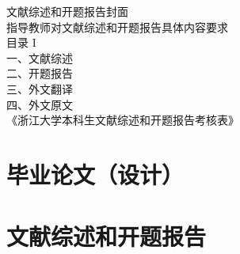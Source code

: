\documentclass[a4paper, 12pt,twoside]{ctexart}
\begin{document}
   
       
    
    \resetoddpageheadings  %
    
    \resetoddpageheadings
    
    \resetoddpageheadings
       
    \resetoddpageheadings
    \thispagestyle{fancy}
    \tableofcontents
    { \hwfs \noindent 文献综述和开题报告封面}\\ 
    { \hwfs \noindent 指导教师对文献综述和开题报告具体内容要求}\\    
    { \hwfs \noindent 目录 \quad I}\\    
    { \hwfs \noindent 一、文献综述 }\\    
    { \hwfs \noindent 二、开题报告 }\\    
    { \hwfs \noindent 三、外文翻译 }\\    
    { \hwfs \noindent 四、外文原文 }\\      
    { \hwfs \noindent 《浙江大学本科生文献综述和开题报告考核表》}
    \newpage
    \thispagestyle{empty} 
    \part{ 毕业论文（设计）}
    \newpage
    \setcounter{page}{1}
    
    \resetoddpageheadings
    
    \resetoddpageheadings
     
    \resetoddpageheadings
     
    \resetoddpageheadings
     
    \resetoddpageheadings
     
    \thispagestyle{empty} 
    \part{文献综述和开题报告}
    \newpage     
\end{document}

